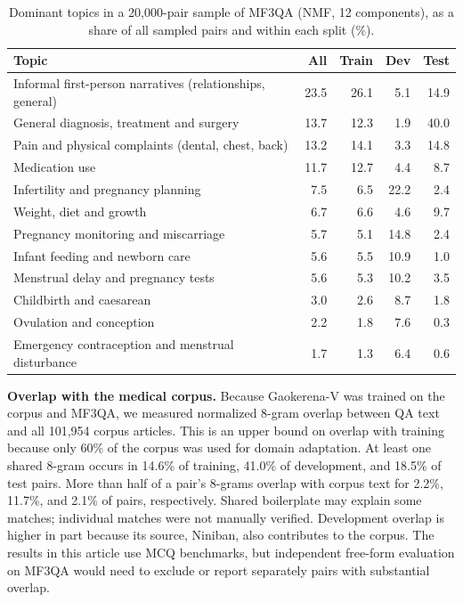 \documentclass[manuscript,screen,review]{acmart}
\begin{document}
\begin{table}[ht]
\caption{Dominant topics in a 20,000-pair sample of MF3QA (NMF, 12 components), as a share of all sampled pairs and within each split (\%).}\label{tab:mf3qa_topics}
\small
\begin{tabular}{@{}lrrrr@{}}
\toprule
Topic & All & Train & Dev & Test \\
\midrule
Informal first-person narratives (relationships, general) & 23.5 & 26.1 & 5.1 & 14.9 \\
General diagnosis, treatment and surgery & 13.7 & 12.3 & 1.9 & 40.0 \\
Pain and physical complaints (dental, chest, back) & 13.2 & 14.1 & 3.3 & 14.8 \\
Medication use & 11.7 & 12.7 & 4.4 & 8.7 \\
Infertility and pregnancy planning & 7.5 & 6.5 & 22.2 & 2.4 \\
Weight, diet and growth & 6.7 & 6.6 & 4.6 & 9.7 \\
Pregnancy monitoring and miscarriage & 5.7 & 5.1 & 14.8 & 2.4 \\
Infant feeding and newborn care & 5.6 & 5.5 & 10.9 & 1.0 \\
Menstrual delay and pregnancy tests & 5.6 & 5.3 & 10.2 & 3.5 \\
Childbirth and caesarean & 3.0 & 2.6 & 8.7 & 1.8 \\
Ovulation and conception & 2.2 & 1.8 & 7.6 & 0.3 \\
Emergency contraception and menstrual disturbance & 1.7 & 1.3 & 6.4 & 0.6 \\
\bottomrule
\end{tabular}
\end{table}

\textbf{Overlap with the medical corpus.} Because Gaokerena-V was trained on the corpus and MF3QA, we measured normalized 8-gram overlap between QA text and all 101,954 corpus articles. This is an upper bound on overlap with training because only 60\% of the corpus was used for domain adaptation. At least one shared 8-gram occurs in 14.6\% of training, 41.0\% of development, and 18.5\% of test pairs. More than half of a pair's 8-grams overlap with corpus text for 2.2\%, 11.7\%, and 2.1\% of pairs, respectively. Shared boilerplate may explain some matches; individual matches were not manually verified. Development overlap is higher in part because its source, Niniban, also contributes to the corpus. The results in this article use MCQ benchmarks, but independent free-form evaluation on MF3QA would need to exclude or report separately pairs with substantial overlap.
\end{document}
